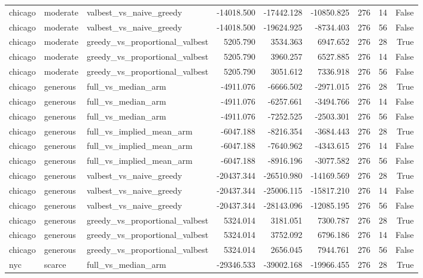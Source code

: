\begin{tabular}{lllrrrrrr}
chicago & moderate & valbest\_vs\_naive\_greedy & -14018.500 & -17442.128 & -10850.825 & 276 & 14 & False \\
chicago & moderate & valbest\_vs\_naive\_greedy & -14018.500 & -19624.925 & -8734.403 & 276 & 56 & False \\
chicago & moderate & greedy\_vs\_proportional\_valbest & 5205.790 & 3534.363 & 6947.652 & 276 & 28 & True \\
chicago & moderate & greedy\_vs\_proportional\_valbest & 5205.790 & 3960.257 & 6527.885 & 276 & 14 & False \\
chicago & moderate & greedy\_vs\_proportional\_valbest & 5205.790 & 3051.612 & 7336.918 & 276 & 56 & False \\
chicago & generous & full\_vs\_median\_arm & -4911.076 & -6666.502 & -2971.015 & 276 & 28 & True \\
chicago & generous & full\_vs\_median\_arm & -4911.076 & -6257.661 & -3494.766 & 276 & 14 & False \\
chicago & generous & full\_vs\_median\_arm & -4911.076 & -7252.525 & -2503.301 & 276 & 56 & False \\
chicago & generous & full\_vs\_implied\_mean\_arm & -6047.188 & -8216.354 & -3684.443 & 276 & 28 & True \\
chicago & generous & full\_vs\_implied\_mean\_arm & -6047.188 & -7640.962 & -4343.615 & 276 & 14 & False \\
chicago & generous & full\_vs\_implied\_mean\_arm & -6047.188 & -8916.196 & -3077.582 & 276 & 56 & False \\
chicago & generous & valbest\_vs\_naive\_greedy & -20437.344 & -26510.980 & -14169.569 & 276 & 28 & True \\
chicago & generous & valbest\_vs\_naive\_greedy & -20437.344 & -25006.115 & -15817.210 & 276 & 14 & False \\
chicago & generous & valbest\_vs\_naive\_greedy & -20437.344 & -28143.096 & -12085.195 & 276 & 56 & False \\
chicago & generous & greedy\_vs\_proportional\_valbest & 5324.014 & 3181.051 & 7300.787 & 276 & 28 & True \\
chicago & generous & greedy\_vs\_proportional\_valbest & 5324.014 & 3752.092 & 6796.186 & 276 & 14 & False \\
chicago & generous & greedy\_vs\_proportional\_valbest & 5324.014 & 2656.045 & 7944.761 & 276 & 56 & False \\
nyc & scarce & full\_vs\_median\_arm & -29346.533 & -39002.168 & -19966.455 & 276 & 28 & True \\

\end{tabular}
